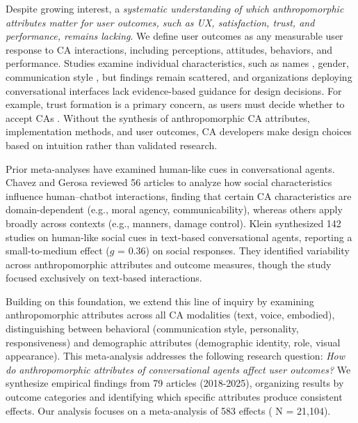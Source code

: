 \documentclass[manuscript,anonymous,sigconf]{acmart}
\begin{document}
Despite growing interest, a \textit{systematic understanding of which anthropomorphic attributes matter for user outcomes, such as UX, satisfaction, trust, and performance, remains lacking}. We define user outcomes as any measurable user response to CA interactions, including perceptions, attitudes, behaviors, and performance. Studies examine individual characteristics, such as names \citep{go2019humanizing}, gender, communication style \citep{seeger2021texting}, but findings remain scattered, and organizations deploying conversational interfaces lack evidence-based guidance for design decisions. For example, trust formation is a primary concern, as users must decide whether to accept CAs \citep{meyer2023leverage,følstad2021chatbots,nordheim2019trust}. Without the synthesis of anthropomorphic CA attributes, implementation methods, and user outcomes, CA developers make design choices based on intuition rather than validated research.

Prior meta-analyses have examined human-like cues in conversational agents. Chavez and Gerosa \cite{chaves2021should} reviewed 56 articles to analyze how social characteristics influence human–chatbot interactions, finding that certain CA characteristics are domain-dependent (e.g., moral agency, communicability), whereas others apply broadly across contexts (e.g., manners, damage control). Klein \cite{klein_effects_2025} synthesized 142 studies on human-like social cues in text-based conversational agents, reporting a small-to-medium effect ($g$ = 0.36) on social responses. They identified variability across anthropomorphic attributes and outcome measures, though the study focused exclusively on text-based interactions. 

Building on this foundation, we extend this line of inquiry by examining anthropomorphic attributes across all CA modalities (text, voice, embodied), distinguishing between behavioral (communication style, personality, responsiveness) and demographic attributes (demographic identity, role, visual appearance). %
This meta-analysis addresses the following research question: 
\textit{How do anthropomorphic attributes of conversational agents affect user outcomes?} 
We synthesize empirical findings from 79 articles (2018-2025), organizing results by outcome categories and identifying which specific attributes produce consistent effects. Our analysis focuses on a meta-analysis of 583 effects ( N = 21,104). %
\end{document}
